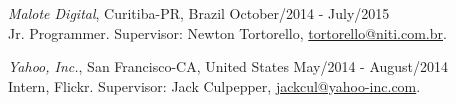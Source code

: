 \documentclass[margin]{res}
\begin{document}
\begin{resume}
			{\sl Malote Digital}, Curitiba-PR, Brazil \hfill October/2014 - July/2015 \\
			Jr. Programmer.
			Supervisor: Newton Tortorello, \href{mailto:tortorello@niti.com.br}{tortorello@niti.com.br}.

			{\sl Yahoo, Inc.}, San Francisco-CA, United States \hfill May/2014 - August/2014 \\
			Intern, Flickr.
			Supervisor: Jack Culpepper, \href{mailto:jackcul@yahoo-inc.com}{jackcul@yahoo-inc.com}.

			


\end{resume}
\end{document}
